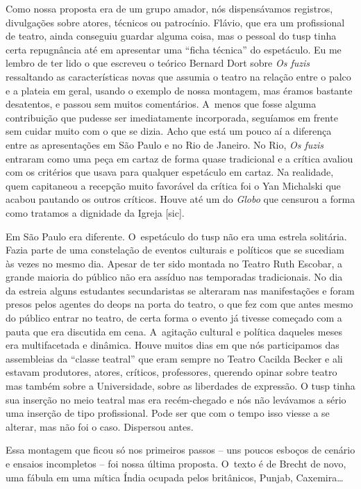 Como nossa proposta era de um grupo amador, nós dispensávamos registros,
divulgações sobre atores, técnicos ou patrocínio. Flávio, que era um
profissional de teatro, ainda conseguiu guardar alguma coisa, mas o
pessoal do {\sc tusp} tinha certa repugnância até em apresentar uma “ficha
técnica” do espetáculo. Eu me lembro de ter lido o que escreveu o
teórico Bernard Dort sobre {\it Os fuzis} ressaltando as características
novas que assumia o teatro na relação entre o palco e a plateia em
geral, usando o exemplo de nossa montagem, mas éramos bastante
desatentos, e passou sem muitos comentários. A~menos que fosse alguma
contribuição que pudesse ser imediatamente incorporada, seguíamos em
frente sem cuidar muito com o que se dizia. Acho que está um pouco aí a
diferença entre as apresentações em São Paulo e no Rio de Janeiro. No
Rio, {\it Os fuzis} entraram como uma peça em cartaz de forma quase
tradicional e a crítica avaliou com os critérios que usava para qualquer
espetáculo em cartaz. Na realidade, quem capitaneou a recepção muito
favorável da crítica foi o Yan Michalski que acabou pautando os outros
críticos. Houve até um do {\it Globo} que censurou a forma como tratamos
a dignidade da Igreja {[}sic{]}.

Em São Paulo era diferente. O~espetáculo do {\sc tusp} não era uma estrela
solitária. Fazia parte de uma constelação de eventos culturais e
políticos que se sucediam às vezes no mesmo dia. Apesar de ter sido
montada no Teatro Ruth Escobar, a grande maioria do público não era
assíduo nas temporadas tradicionais. No dia da estreia alguns estudantes
secundaristas se alteraram nas manifestações e foram presos pelos
agentes do {\sc deops} na porta do teatro, o que fez com que antes mesmo do
público entrar no teatro, de certa forma o evento já tivesse começado
com a pauta que era discutida em cena. A~agitação cultural e política
daqueles meses era multifacetada e dinâmica. Houve muitos dias em que
nós participamos das assembleias da “classe teatral” que eram sempre no
Teatro Cacilda Becker e ali estavam produtores, atores, críticos,
professores, querendo opinar sobre teatro mas também sobre a
Universidade, sobre as liberdades de expressão. O {\sc tusp} tinha sua
inserção no meio teatral mas era recém-chegado e nós não levávamos a
sério uma inserção de tipo profissional. Pode ser que com o tempo isso
viesse a se alterar, mas não foi o caso. Dispersou antes.

\subject{A montagem truncada de “Mann ist Mann”}

Essa montagem que ficou só nos primeiros passos -- uns poucos esboços de
cenário e ensaios incompletos -- foi nossa última proposta. O~texto é de
Brecht de novo, uma fábula em uma mítica Índia ocupada pelos britânicos,
Punjab, Caxemira\ldots{}

